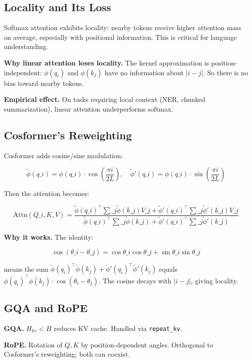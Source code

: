 \subsection{Locality and Its Loss}

Softmax attention exhibits locality: nearby tokens receive higher attention 
mass on average, especially with positional information. This is critical 
for language understanding.

\textbf{Why linear attention loses locality.} The kernel approximation is 
position-independent: $\phi(q_i)$ and $\phi(k_j)$ have no information about 
$|i - j|$. So there is no bias toward nearby tokens.

\textbf{Empirical effect.} On tasks requiring local context (NER, chunked 
summarization), linear attention underperforms softmax.

\subsection{Cosformer's Reweighting}

Cosformer adds cosine/sine modulation:

\[
\tilde{\phi}(q\_i) = \phi(q\_i) \cdot \cos\!\left(\frac{\pi i}{2 L}\right), \quad
\tilde{\phi}'(q\_i) = \phi(q\_i) \cdot \sin\!\left(\frac{\pi i}{2 L}\right)
\]

Then the attention becomes:

\[
\text{Attn}(Q\_i, K, V) = \frac{\tilde{\phi}(q\_i)^\top \sum\_j \tilde{\phi}(k\_j) V\_j + \tilde{\phi}'(q\_i)^\top \sum\_j \tilde{\phi}'(k\_j) V\_j}{\tilde{\phi}(q\_i)^\top \sum\_j \tilde{\phi}(k\_j) + \tilde{\phi}'(q\_i)^\top \sum\_j \tilde{\phi}'(k\_j)}
\]

\textbf{Why it works.} The identity:

\[
\cos(\theta\_i - \theta\_j) = \cos\theta\_i \cos\theta\_j + \sin\theta\_i \sin\theta\_j
\]

means the sum $\tilde{\phi}(q_i)^\top \tilde{\phi}(k_j) + \tilde{\phi}'(q_i)^\top \tilde{\phi}'(k_j)$ 
equals $\phi(q_i)^\top \phi(k_j) \cdot \cos(\theta_i - \theta_j)$. The 
cosine decays with $|i - j|$, giving locality.

\subsection{GQA and RoPE}

\textbf{GQA.} $H_{kv} < H$ reduces KV cache. Handled via \texttt{repeat\_kv}.

\textbf{RoPE.} Rotation of $Q, K$ by position-dependent angles. Orthogonal to 
Cosformer's reweighting; both can coexist.

